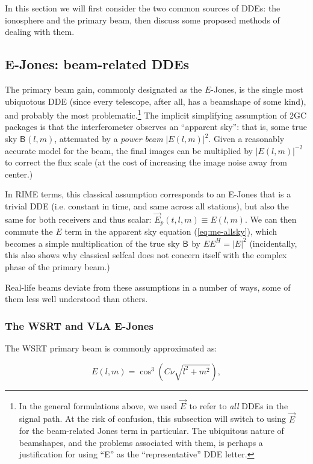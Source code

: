 \documentclass[]{aa}
\newcommand{\herm}{H}
\newcommand{\jones}[2]{\vec {#1}_{#2}}
\newcommand{\coh}[2]{\mathsf{{#1}}_{{#2}}}
\begin{document}
In this section we will first consider the two common sources of DDEs: the ionosphere and the primary beam, then discuss some proposed methods of dealing with them.

\subsection{E-Jones: beam-related DDEs\label{sec:E-Jones}}

The primary beam gain, commonly designated as the $E$-Jones, is the single most ubiquotous DDE (since every telescope, after all, has a beamshape of some kind), and probably the most problematic.\footnote{In the general formulations above, we used $\jones{E}{}$ to refer to {\em all} DDEs in the signal path. At the risk of confusion, this subsection will switch to using  $\jones{E}{}$ for the beam-related Jones term in particular. The ubiquitous nature of beamshapes, and the problems associated with them, is perhaps a justification for using ``E'' as the ``representative'' DDE letter.} The implicit simplifying assumption of 2GC packages is that the interferometer observes an ``apparent sky'': that is, some true sky $\coh{B}{}(l,m)$, attenuated by a {\em power beam} $|E(l,m)|^2$. Given a reasonably accurate model for the beam, the final images can be multiplied by $|E(l,m)|^{-2}$ to correct the flux scale (at the cost of increasing the image noise away from center.)

In RIME terms, this classical assumption corresponds to an E-Jones that is a trivial DDE (i.e. constant in time, and same across all stations), but also the same for both receivers and thus scalar: $\jones{E}{p}(t,l,m) \equiv E(l,m)$. We can then commute the $E$ term in the apparent sky equation (\ref{eq:me-allsky}), which becomes
a simple multiplication of the true sky $\coh{B}{}$ by $EE^\herm=|E|^2$ (incidentally, this also shows why classical selfcal does not concern itself with the complex phase of the primary beam.) 

Real-life beams deviate from these assumptions in a number of ways, some of them less well understood than others.

\subsubsection{The WSRT and VLA E-Jones\label{sec:E-Jones:wsrt}\label{sec:E-Jones:vla}}

The WSRT primary beam is commonly approximated as:

\[
E(l,m) = \cos^3(C\nu\sqrt{l^2+m^2}),
\]
\end{document}
